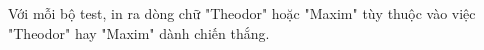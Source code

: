 Với mỗi bộ test, in ra dòng chữ "Theodor" hoặc "Maxim" tùy thuộc vào việc "Theodor" hay "Maxim" dành chiến thắng.  

\